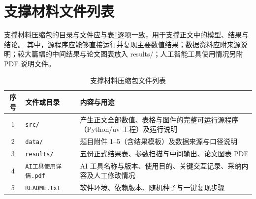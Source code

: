 \section{支撑材料文件列表}
支撑材料压缩包的目录与文件应与表\ref{tab:support-list}逐项一致，用于支撑正文中的模型、结果与结论。
其中，源程序应能够直接运行并复现主要数值结果；数据资料应附来源说明；较大篇幅的中间结果与论文图表放入 results/；人工智能工具使用情况另附 PDF 说明文件。

\begin{table}[htbp]\centering
\caption{支撑材料压缩包文件列表}\label{tab:support-list}
\small
\begin{tabularx}{\textwidth}{c l X}
\toprule
\textbf{序号} & \textbf{文件或目录} & \textbf{内容与用途} \\
\midrule
1 & \texttt{src/} & 产生正文全部数值、表格与图件的完整可运行源程序（Python/uv 工程）及运行说明 \\
2 & \texttt{data/} & 题目附件 1--5（含结果模板）及数据来源与口径说明 \\
3 & \texttt{results/} & 五份正式结果表、参数扫描与中间输出、论文图表 PDF \\
4 & \texttt{AI工具使用详情.pdf} & AI 工具名称与版本、使用目的、关键交互记录、采纳内容及人工修改情况 \\
5 & \texttt{README.txt} & 软件环境、依赖版本、随机种子与一键复现步骤 \\
\bottomrule
\end{tabularx}
\end{table}

